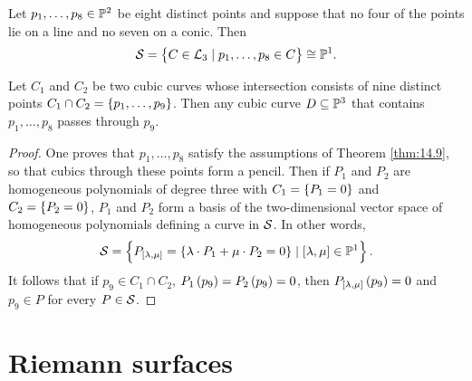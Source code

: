 \begin{proposition}
Let $ p_1, \dots, p_8 \in \P^2 $ be eight distinct points and suppose that no four of the points lie on a line and no seven on a conic. Then
$$ \SS = \cbr{C \in \LL_3 \mid p_1, \dots, p_8 \in C} \cong \P^1. $$
\end{proposition}

\begin{corollary}
Let $ C_1 $ and $ C_2 $ be two cubic curves whose intersection consists of nine distinct points $ C_1 \cap C_2 = \cbr{p_1, \dots, p_9} $. Then any cubic curve $ D \subseteq \P^3 $ that contains $ p_1, \dots, p_8 $ passes through $ p_9 $.
\end{corollary}

\begin{proof}
One proves that $ p_1, \dots, p_8 $ satisfy the assumptions of Theorem \ref{thm:14.9}, so that cubics through these points form a pencil. Then if $ P_1 $ and $ P_2 $ are homogeneous polynomials of degree three with $ C_1 = \cbr{P_1 = 0} $ and $ C_2 = \cbr{P_2 = 0} $, $ P_1 $ and $ P_2 $ form a basis of the two-dimensional vector space of homogeneous polynomials defining a curve in $ \SS $. In other words,
$$ \SS = \cbr{P_{\sbr{\lambda, \mu}} = \cbr{\lambda \cdot P_1 + \mu \cdot P_2 = 0} \mid \sbr{\lambda, \mu} \in \P^1}. $$
It follows that if $ p_9 \in C_1 \cap C_2 $, $ P_1\br{p_9} = P_2\br{p_9} = 0 $, then $ P_{\sbr{\lambda, \mu}}\br{p_9} = 0 $ and $ p_9 \in P $ for every $ P \in \SS $.
\end{proof}

\pagebreak

\section{Riemann surfaces}

